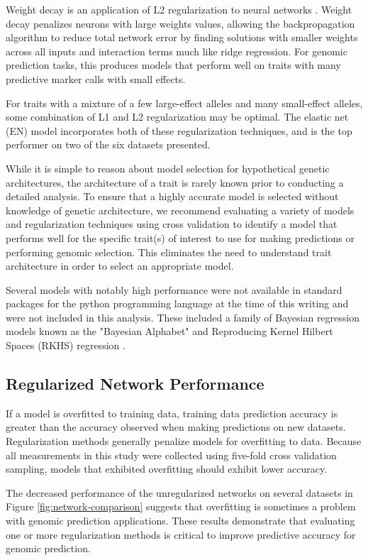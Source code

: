 Weight decay is an application of L2 regularization to neural networks 
\citep{krogh1992}. Weight decay penalizes neurons with large weights values, 
allowing the backpropagation algorithm to reduce total network error by finding 
solutions with smaller weights across all inputs and interaction terms much like
ridge regression. For genomic prediction tasks, this produces models 
that perform well on traits with many predictive marker calls with small effects. 

For traits with a mixture of a few large-effect alleles and many small-effect
alleles, some combination of L1 and L2 regularization may be optimal. 
The elastic net (EN) model incorporates both of these regularization
techniques, and is the top performer on two of the six datasets presented.

While it is simple to reason about model selection for hypothetical 
genetic architectures, the architecture of a trait is rarely known prior to 
conducting a detailed analysis. To ensure that a highly accurate 
model is selected without knowledge of genetic architecture, 
we recommend evaluating a variety of models and regularization 
techniques using cross validation to identify a model that performs
well for the specific trait(s) of interest to use for making 
predictions or performing genomic selection. This eliminates 
the need to understand trait architecture in order to select an appropriate 
model.

Several models with notably high performance were not available in standard packages for
the python programming language at the time of this writing and were not included 
in this analysis. These included a family of Bayesian regression models known 
as the "Bayesian Alphabet" \citep{gianola2009} and Reproducing Kernel Hilbert 
Spaces (RKHS) regression \citep{gianola2006}.

\subsection*{Regularized Network Performance}

If a model is overfitted to training data, training data prediction accuracy is greater than 
the accuracy observed when making predictions on new datasets. Regularization methods
generally penalize models for overfitting to data. Because all measurements in this study 
were collected using five-fold cross validation sampling, models that exhibited overfitting 
should exhibit lower accuracy.

The decreased performance of the unregularized networks on several datasets in Figure 
\ref{fig:network-comparison} suggests that overfitting is sometimes a problem with 
genomic prediction applications. These results demonstrate that evaluating one 
or more regularization methods is critical to improve predictive accuracy for 
genomic prediction.

